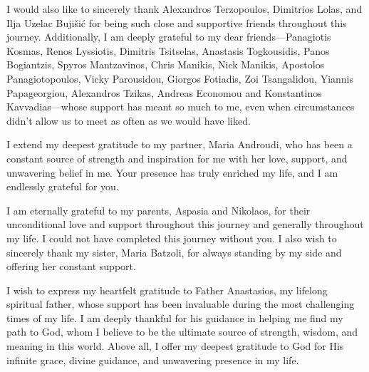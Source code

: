 \begin{acknowledgements}
I would also like to sincerely thank Alexandros Terzopoulos, Dimitrios Lolas, and Ilja Uzelac Bujišić for being such close and supportive friends throughout this journey. Additionally, I am deeply grateful to my dear friends—Panagiotis Kosmas, Renos Lyssiotis, Dimitris Tsitselas, Anastasis Togkousidis, Panos Bogiantzis, Spyros Mantzavinos, Chris Manikis, Nick Manikis, Apostolos Panagiotopoulos, Vicky Parousidou, Giorgos Fotiadis, Zoi Tsangalidou, Yiannis Papageorgiou, Alexandros Tzikas, Andreas Economou and Konstantinos Kavvadias—whose support has meant so much to me, even when circumstances didn’t allow us to meet as often as we would have liked.

I extend my deepest gratitude to my partner, Maria Androudi, who has been a constant source of strength and inspiration for me with her love, support, and unwavering belief in me. Your presence has truly enriched my life, and I am endlessly grateful for you.

I am eternally grateful to my parents, Aspasia and Nikolaos, for their unconditional love and support throughout this journey and generally throughout my life. I could not have completed this journey without you. I also wish to sincerely thank my sister, Maria Batzoli, for always standing by my side and offering her constant support.

I wish to express my heartfelt gratitude to Father Anastasios, my lifelong spiritual father, whose support has been invaluable during the most challenging times of my life. I am deeply thankful for his guidance in helping me find my path to God, whom I believe to be the ultimate source of strength, wisdom, and meaning in this world. Above all, I offer my deepest gratitude to God for His infinite grace, divine guidance, and unwavering presence in my life.

\end{acknowledgements}
